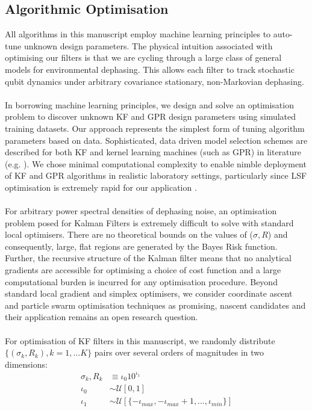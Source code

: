\subsection{Algorithmic Optimisation \label{sec:main:Optimisation}}

All algorithms in this manuscript employ machine learning principles to auto-tune unknown design parameters. The physical intuition associated with optimising our filters is that we are cycling through a large class of general models for environmental dephasing. This allows each filter to track stochastic qubit dynamics under arbitrary covariance stationary, non-Markovian dephasing. 
\\
\\
In borrowing machine learning principles, we design and solve an optimisation problem to discover unknown KF and GPR design parameters using simulated training datasets. Our approach represents the simplest form of tuning algorithm parameters based on data. Sophisticated, data driven model selection schemes are described for both KF and kernel learning machines (such as GPR) in literature (e.g. \cite{arlot2009data, vu2015understanding}). We chose minimal computational complexity to enable nimble deployment of KF and GPR algorithms in realistic laboratory settings, particularly since LSF optimisation is extremely rapid for our application \cite{mavadia2017}.
\\
\\
For arbitrary power spectral densities of dephasing noise, an optimisation problem posed for Kalman Filters is extremely difficult to solve with standard local optimisers. There are no theoretical bounds on the values of ($\sigma, R$) and consequently, large, flat regions are generated by the Bayes Risk function. Further, the recursive structure of the Kalman filter means that no analytical gradients are accessible for optimising a choice of cost function and a large computational burden is incurred for any optimisation procedure. Beyond standard local gradient and simplex optimisers, we consider coordinate ascent \cite{abbeel2005} and particle swarm optimisation techniques \cite{robertson2017particle} as promising, nascent candidates and their application remains an open research question. 
\\  
\\
For optimisation of KF filters in this manuscript, we randomly distribute $\{(\sigma_{k}, R_{k}), k=1, \hdots K \}$ pairs over several orders of magnitudes in two dimensions:
\begin{align}
\sigma_k, R_k &\equiv \iota_0 10^{\iota_1} \\
\iota_0 & \sim \mathcal{U}[0, 1]\\
\iota_1 & \sim \mathcal{U}[\{ -\iota_{max}, -\iota_{max} + 1,  \hdots,  \iota_{min}\}]
\end{align}

